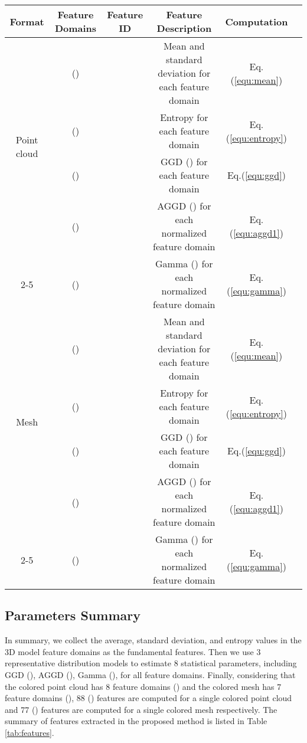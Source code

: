 \documentclass[lettersize,journal]{IEEEtran}
\begin{document}
\begin{table*}[t]
\renewcommand\arraystretch{1.5}
\renewcommand\tabcolsep{3.0pt}
\setlength{\abovecaptionskip}{-5pt}
  \caption{Summary of features extracted in the proposed method}
  
  \label{tab:features}
  \begin{center}
  \begin{tabular}{cccccc}
    \toprule
    Format & Feature Domains & Feature ID & Feature Description  &  Computation\\
    \hline
    \multirow{4}{*}{Point cloud} 
    & () &       & Mean and standard deviation for each feature domain    &  Eq.(\ref{equ:mean})  \\
    \cline{2-5}
    & () &   & Entropy for each feature domain  &  Eq.(\ref{equ:entropy})    \\
    \cline{2-5}
    & () &   &GGD () for each feature domain  &  Eq.(\ref{equ:ggd})    \\
    \cline{2-5}
     & () &   & AGGD () for each normalized feature domain  &  Eq.(\ref{equ:aggd1})    \\
     \cline{2-5}
     & () &   & Gamma () for each normalized feature domain  &  Eq.(\ref{equ:gamma})    \\
     \hline
     
    \multirow{4}{*}{Mesh} 
    & () &       & Mean and standard deviation for each feature domain    &  Eq.(\ref{equ:mean})  \\
    \cline{2-5}
    & () &   & Entropy for each feature domain  &   Eq.(\ref{equ:entropy})    \\
    \cline{2-5}
    & () &   &GGD () for each feature domain  &  Eq.(\ref{equ:ggd})    \\
    \cline{2-5}
     & () &   & AGGD () for each normalized feature domain  &   Eq.(\ref{equ:aggd1})    \\
     \cline{2-5}
     & () &   & Gamma () for each normalized feature domain  & Eq.(\ref{equ:gamma})    \\
    \bottomrule
  \end{tabular}
  \end{center}
\end{table*}

\subsection{Parameters Summary}
In summary, we collect the average, standard deviation, and entropy values in the 3D model feature domains as the fundamental features. Then we use 3 representative distribution models to estimate 8 statistical parameters, including GGD (), AGGD (), Gamma (), for all feature domains. Finally, considering that the colored point cloud has 8 feature domains () and the colored mesh has 7 feature domains (), 88 () features are computed for a single colored point cloud and 77 () features are computed for a single colored mesh respectively. The summary of features extracted in the proposed method is listed in Table \ref{tab:features}.
\end{document}
